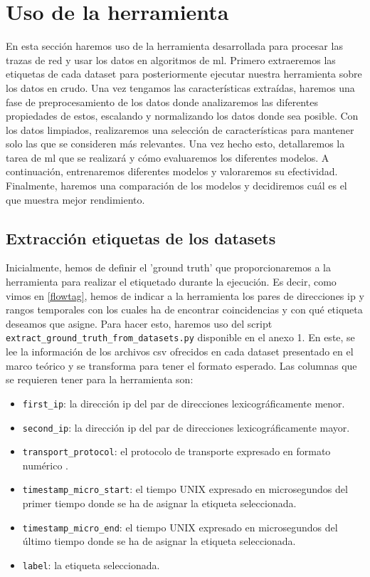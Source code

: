 \section{Uso de la herramienta}

En esta sección haremos uso de la herramienta desarrollada para procesar las trazas de red y usar los datos en algoritmos de \gls{ml}. Primero extraeremos las etiquetas de cada dataset para posteriormente ejecutar nuestra herramienta sobre los datos en crudo. Una vez tengamos las características extraídas, haremos una fase de preprocesamiento de los datos donde analizaremos las diferentes propiedades de estos, escalando y normalizando los datos donde sea posible. Con los datos limpiados, realizaremos una selección de características para mantener solo las que se consideren más relevantes. Una vez hecho esto, detallaremos la tarea de \gls{ml} que se realizará y cómo evaluaremos los diferentes modelos. A continuación, entrenaremos diferentes modelos y valoraremos su efectividad. Finalmente, haremos una comparación de los modelos y decidiremos cuál es el que muestra mejor rendimiento.

\subsection{Extracción etiquetas de los datasets}

Inicialmente, hemos de definir el 'ground truth' que proporcionaremos a la herramienta para realizar el etiquetado durante la ejecución. Es decir, como vimos en \ref{flowtag}, hemos de indicar a la herramienta los pares de direcciones \acrshort{ip} y rangos temporales con los cuales ha de encontrar coincidencias y con qué etiqueta deseamos que asigne. Para hacer esto, haremos uso del script \texttt{extract\-\_ground\-\_truth\-\_from\-\_datasets.py} disponible en el anexo 1. En este, se lee la información de los archivos \acrshort{csv} ofrecidos en cada dataset presentado en el marco teórico y se transforma para tener el formato esperado. Las columnas que se requieren tener para la herramienta son:

\begin{itemize}
    \item \texttt{first\_ip}: la dirección \acrshort{ip} del par de direcciones lexicográficamente menor.
    \item \texttt{second\_ip}: la dirección \acrshort{ip} del par de direcciones lexicográficamente mayor.
    \item \texttt{transport\_protocol}: el protocolo de transporte expresado en formato numérico \cite{ipprotocolnumbers}.
    \item \texttt{timestamp\_micro\_start}: el tiempo UNIX expresado en microsegundos del primer tiempo donde se ha de asignar la etiqueta seleccionada.
    \item \texttt{timestamp\_micro\_end}:  el tiempo UNIX expresado en microsegundos del último tiempo donde se ha de asignar la etiqueta seleccionada.
    \item \texttt{label}: la etiqueta seleccionada.
\end{itemize}

